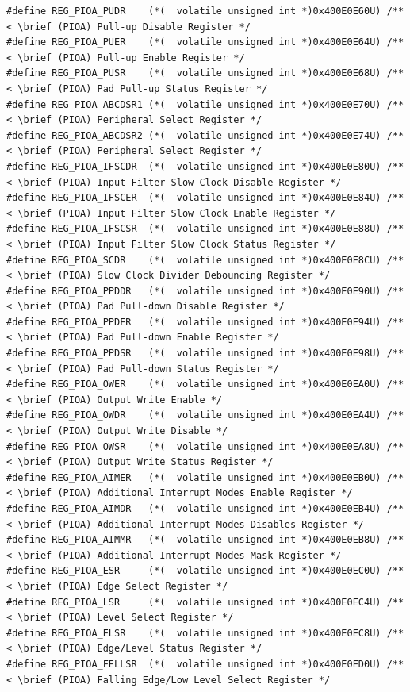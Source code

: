 \documentclass[12pt]{article}
\begin{document}
\begin{tiny}
\begin{verbatim}
#define REG_PIOA_PUDR    (*(  volatile unsigned int *)0x400E0E60U) /**< \brief (PIOA) Pull-up Disable Register */
#define REG_PIOA_PUER    (*(  volatile unsigned int *)0x400E0E64U) /**< \brief (PIOA) Pull-up Enable Register */
#define REG_PIOA_PUSR    (*(  volatile unsigned int *)0x400E0E68U) /**< \brief (PIOA) Pad Pull-up Status Register */
#define REG_PIOA_ABCDSR1 (*(  volatile unsigned int *)0x400E0E70U) /**< \brief (PIOA) Peripheral Select Register */
#define REG_PIOA_ABCDSR2 (*(  volatile unsigned int *)0x400E0E74U) /**< \brief (PIOA) Peripheral Select Register */
#define REG_PIOA_IFSCDR  (*(  volatile unsigned int *)0x400E0E80U) /**< \brief (PIOA) Input Filter Slow Clock Disable Register */
#define REG_PIOA_IFSCER  (*(  volatile unsigned int *)0x400E0E84U) /**< \brief (PIOA) Input Filter Slow Clock Enable Register */
#define REG_PIOA_IFSCSR  (*(  volatile unsigned int *)0x400E0E88U) /**< \brief (PIOA) Input Filter Slow Clock Status Register */
#define REG_PIOA_SCDR    (*(  volatile unsigned int *)0x400E0E8CU) /**< \brief (PIOA) Slow Clock Divider Debouncing Register */
#define REG_PIOA_PPDDR   (*(  volatile unsigned int *)0x400E0E90U) /**< \brief (PIOA) Pad Pull-down Disable Register */
#define REG_PIOA_PPDER   (*(  volatile unsigned int *)0x400E0E94U) /**< \brief (PIOA) Pad Pull-down Enable Register */
#define REG_PIOA_PPDSR   (*(  volatile unsigned int *)0x400E0E98U) /**< \brief (PIOA) Pad Pull-down Status Register */
#define REG_PIOA_OWER    (*(  volatile unsigned int *)0x400E0EA0U) /**< \brief (PIOA) Output Write Enable */
#define REG_PIOA_OWDR    (*(  volatile unsigned int *)0x400E0EA4U) /**< \brief (PIOA) Output Write Disable */
#define REG_PIOA_OWSR    (*(  volatile unsigned int *)0x400E0EA8U) /**< \brief (PIOA) Output Write Status Register */
#define REG_PIOA_AIMER   (*(  volatile unsigned int *)0x400E0EB0U) /**< \brief (PIOA) Additional Interrupt Modes Enable Register */
#define REG_PIOA_AIMDR   (*(  volatile unsigned int *)0x400E0EB4U) /**< \brief (PIOA) Additional Interrupt Modes Disables Register */
#define REG_PIOA_AIMMR   (*(  volatile unsigned int *)0x400E0EB8U) /**< \brief (PIOA) Additional Interrupt Modes Mask Register */
#define REG_PIOA_ESR     (*(  volatile unsigned int *)0x400E0EC0U) /**< \brief (PIOA) Edge Select Register */
#define REG_PIOA_LSR     (*(  volatile unsigned int *)0x400E0EC4U) /**< \brief (PIOA) Level Select Register */
#define REG_PIOA_ELSR    (*(  volatile unsigned int *)0x400E0EC8U) /**< \brief (PIOA) Edge/Level Status Register */
#define REG_PIOA_FELLSR  (*(  volatile unsigned int *)0x400E0ED0U) /**< \brief (PIOA) Falling Edge/Low Level Select Register */

\end{verbatim}
\end{tiny}
\end{document}
